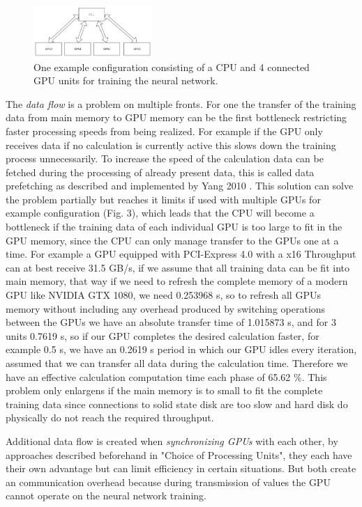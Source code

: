 \documentclass[conference]{IEEEtran}
\begin{document}
\begin{figure}
\centering
\includegraphics[width=0.4\textwidth]{example_configuration.png}
\caption{One example configuration consisting of a CPU and 4 connected GPU units for training the neural network.}
\end{figure}

The \emph{data flow} is a problem on multiple fronts. For one the transfer of the training data from main memory to GPU memory can be the first bottleneck restricting faster processing speeds from being realized. For example if the GPU only receives data if no calculation is currently active this slows down the training process unnecessarily. To increase the speed of the calculation data can be fetched during the processing of already present data, this is called data prefetching as described and implemented by Yang 2010 \cite{yang2010gpgpu}. This solution can solve the problem partially but reaches it limits if used with multiple GPUs for example configuration (Fig. 3), which leads that the CPU will become a bottleneck if the training data of each individual GPU is too large to fit in the GPU memory, since the CPU can only manage transfer to the GPUs one at a time. For example a GPU equipped with PCI-Express 4.0 with a x16 Throughput can at best receive 31.5 GB/s, if we assume that all training data can be fit into main memory, that way if we need to refresh the complete memory of a modern GPU like NVIDIA GTX 1080, we need 0.253968 s, so to refresh all GPUs memory without including any overhead produced by switching operations between the GPUs we have an absolute transfer time of 1.015873 s, and for 3 units 0.7619 s, so if our GPU completes the desired calculation faster, for example 0.5 s, we have an 0.2619 s period in which our GPU idles every iteration, assumed that we can transfer all data during the calculation time. Therefore we have an effective calculation computation time each phase of 65.62 \%. This problem only enlargens if the main memory is to small to fit the complete training data since connections to solid state disk are too slow and hard disk do physically do not reach the required throughput.

Additional data flow is created when \emph{synchronizing GPUs} with each other, by approaches described beforehand in "Choice of Processing Units", they each have their own advantage but can limit efficiency in certain situations. But both create an communication overhead because during transmission of values the GPU cannot operate on the neural network training.
\end{document}
